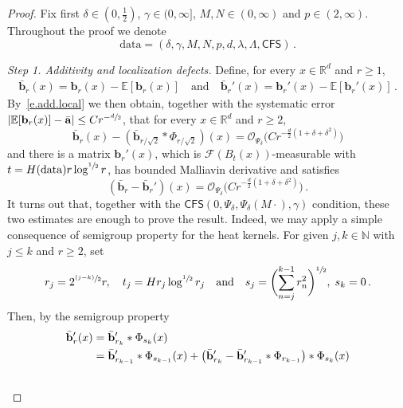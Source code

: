 \documentclass[11pt]{article} %
\numberwithin{equation}{section}
\theoremstyle{definition}
\newcommand*{\N}{\ensuremath{\mathbb{N}}}
\newcommand*{\R}{\ensuremath{\mathbb{R}}}
\renewcommand{\b}{\ensuremath{\mathbf{b}}}
\newcommand{\qand}{\quad \mbox{and} \quad }
\renewcommand{\a}{\mathbf{a}}
\newcommand{\ahom}{\bar{\a}}
\newcommand{\bhom}{\bar{\mathbf{b}}}
\newcommand{\E}{\mathbb{E}}
\renewcommand{\O}{\mathcal{O}}
\newcommand{\data}{\mathrm{data}}
\newcommand{\CFS}{\mathsf{CFS}}
\begin{document}
\begin{proof}
Fix first $\delta \in (0,\frac12)$, $\gamma \in (0,\infty]$, $M,N \in (0,\infty)$ and $ p \in (2,\infty)$.  Throughout the proof we denote
\begin{equation*}  
\data = (\delta,\gamma,M,N,p,d,\lambda,\Lambda,\CFS)
\,.
\end{equation*} 

\smallskip 

\emph{Step 1. Additivity and localization defects.} 
Define, for every $x \in \R^d$ and $r \geq 1$, 
\begin{align*}  
\bhom_{r}(x) = \b_{r}(x) -  \E[\b_{r}(x)] \qand  \bhom_{r}'(x) = \b_{r}'(x) -  \E[\b_{r}'(x)] 
\,.
\end{align*}
By~\eqref{e.add.local} we then obtain, together with the systematic error $|\E[\b_{r}(x)] - \ahom| \leq C r^{-\sfrac d2}$, that   for every $x \in \R^d$ and $r \geq 2$,
\begin{equation} \label{e.betazero.add}
 \bhom_{r}(x) -  (\bhom_{r/\sqrt 2}  \ast \Phi_{r/\sqrt 2})(x)   = \O_{\Psi_\delta}  \bigl(C r^{-\frac{d}{2}(1+\delta + \delta^2)} \bigr) 
\end{equation}
and there is a matrix $\b_r'(x)$, which is $\mathcal{F}(B_{t}(x))$-measurable with $t = H(\data) r \log^{\sfrac 12} r$, has bounded Malliavin derivative and satisfies
\begin{equation}  \label{e.betazero.local}
(\bhom_{r} - \bhom_{r}')(x) = \O_{\Psi_\delta}  \bigl(C r^{-\frac{d}{2}(1+\delta+ \delta^2)} \bigr) 
\,.
\end{equation}
It turns out that, together with the $\CFS(0,\Psi_\delta,\Psi_\delta(M\cdot),\gamma)$ condition, these two estimates are enough to prove the result. Indeed, we may apply a simple consequence of semigroup property for the heat kernels. For given $j,k \in \N$ with $j \leq k$ and $r \geq 2$, set
\begin{equation*}  
r_j = 2^{\sfrac {(j{-}k)}2} r , \quad t_j = H r_j \log^{\sfrac12} r_j
\qand
s_j = \biggl( \sum_{n=j}^{k-1} r_n^2 \biggr)^{\sfrac12}, \; s_k = 0
\,.
\end{equation*}
Then, by the semigroup property 
\begin{align}  \label{e.scalinglimit.id}
\notag
\bhom_{r}' (x)  
& = 
\bhom_{r_{k}}'  \ast \Phi_{s_{k}}(x) 
\\ \notag
& = 
\bhom_{r_{k-1}}'  \ast \Phi_{s_{k-1}}(x) 
+
\bigl(  \bhom_{r_{k}}' - \bhom_{r_{k-1}}' \ast \Phi_{r_{k-1}} \bigr) \ast \Phi_{s_{k}}(x) 
\\ \notag 

\end{align}
\end{proof}
\end{document}
